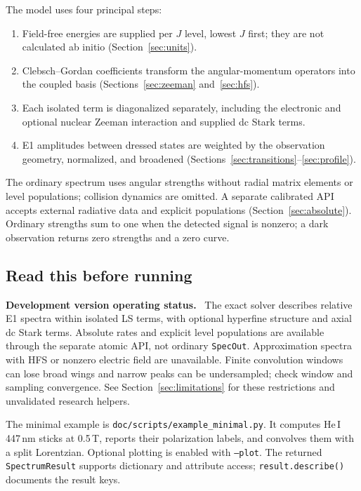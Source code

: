 \documentclass[11pt,a4paper]{article}
\newcommand{\code}[1]{\texttt{#1}}
\newenvironment{caveat}[1][Caveat]{%
  \par\smallskip\noindent\begin{lrbox}{\notebox}\setlength{\fboxsep}{6pt}\begin{minipage}{\dimexpr\linewidth-2\fboxsep-2\fboxrule\relax}\small\textbf{#1.}\ }{%
  \end{minipage}\end{lrbox}\setlength{\fboxsep}{6pt}\fcolorbox{warnframe}{warnbg}{\usebox{\notebox}}\par\smallskip}
\numberwithin{equation}{section}
\begin{document}
The model uses four principal steps:
\begin{enumerate}\setlength{\itemsep}{0pt}
  \item Field-free energies are supplied per $J$ level, lowest $J$ first;
        they are not calculated ab initio (Section~\ref{sec:units}).
  \item Clebsch--Gordan coefficients transform the angular-momentum
        operators into the coupled basis (Sections~\ref{sec:zeeman}
        and~\ref{sec:hfs}).
  \item Each isolated term is diagonalized separately, including the
        electronic and optional nuclear Zeeman interaction and supplied dc Stark terms.
  \item E1 amplitudes between dressed states are weighted by the
        observation geometry, normalized, and broadened
        (Sections~\ref{sec:transitions}--\ref{sec:profile}).
\end{enumerate}
The ordinary spectrum uses angular strengths without radial matrix elements or level populations; collision dynamics are omitted. A separate calibrated API accepts external radiative data and explicit populations (Section~\ref{sec:absolute}). Ordinary strengths
sum to one when the detected signal is nonzero; a dark observation
returns zero strengths and a zero curve.

\subsection{Read this before running}
\begin{caveat}[Development version operating status]
The exact solver describes relative E1 spectra within isolated LS terms,
with optional hyperfine structure and axial dc Stark terms. Absolute rates and explicit level populations
are available through the separate atomic API, not ordinary \code{SpecOut}. Approximation spectra with HFS or nonzero electric field are unavailable. Finite
convolution windows can lose broad wings and narrow peaks can be undersampled;
check window and sampling convergence. See Section~\ref{sec:limitations}
for these restrictions and unvalidated research helpers.
\end{caveat}

The minimal example is \code{doc/scripts/example\_minimal.py}. It computes
He\,I 447\,nm sticks at 0.5\,T, reports their polarization labels, and
convolves them with a split Lorentzian. Optional plotting is enabled with
\code{--plot}. The returned \code{SpectrumResult} supports dictionary and
attribute access; \code{result.describe()} documents the result keys.
\end{document}
